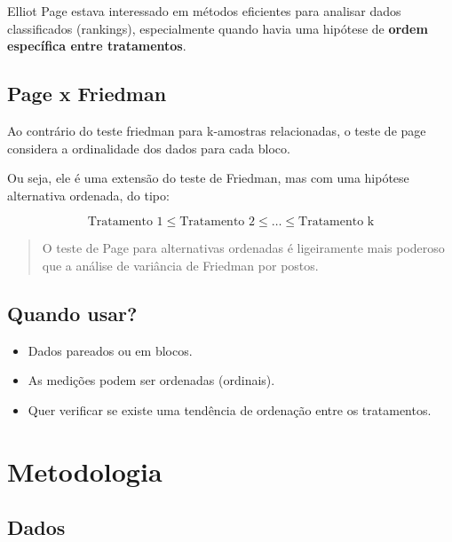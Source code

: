 \documentclass[
  letterpaper,
  DIV=11,
  numbers=noendperiod]{scrartcl}
\begin{document}
Elliot Page estava interessado em métodos eficientes para analisar dados
classificados (rankings), especialmente quando havia uma hipótese de
\textbf{ordem específica entre tratamentos}.

\subsection{Page x Friedman}\label{page-x-friedman}

Ao contrário do teste friedman para k-amostras relacionadas, o teste de
page considera a ordinalidade dos dados para cada bloco.

Ou seja, ele é uma extensão do teste de Friedman, mas com uma hipótese
alternativa ordenada, do tipo:

\[ \text{Tratamento 1} \leq \text{Tratamento 2} \leq \dots \leq \text{Tratamento k}
\]

\begin{quote}
O teste de Page para alternativas ordenadas é ligeiramente mais poderoso
que a análise de variância de Friedman por postos.
\end{quote}

\subsection{Quando usar?}\label{quando-usar}

\begin{itemize}
\item
  Dados pareados ou em blocos.
\item
  As medições podem ser ordenadas (ordinais).
\item
  Quer verificar se existe uma tendência de ordenação entre os
  tratamentos.
\end{itemize}

\section{Metodologia}\label{metodologia}

\subsection{Dados}\label{dados}
\end{document}
